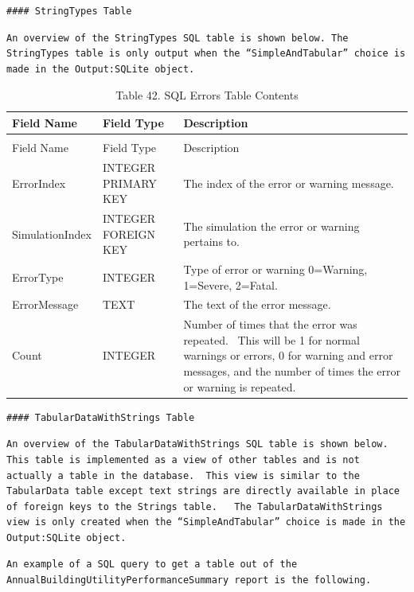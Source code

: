 \begin{lstlisting}
#### StringTypes Table
\end{lstlisting}

\begin{lstlisting}
An overview of the StringTypes SQL table is shown below. The StringTypes table is only output when the “SimpleAndTabular” choice is made in the Output:SQLite object.
\end{lstlisting}

\begin{longtable}[c]{p{1.5in}p{1.5in}p{2.99in}}
\caption{Table 42. SQL Errors Table Contents \label{table:table-42.-sql-errors-table-contents}} \tabularnewline
\toprule 
Field Name & Field Type & Description \tabularnewline
\midrule
\endfirsthead

\caption[]{Table 42. SQL Errors Table Contents} \tabularnewline
\toprule 
Field Name & Field Type & Description \tabularnewline
\midrule
\endhead

ErrorIndex & INTEGER PRIMARY KEY & The index of the error or warning message. \tabularnewline
SimulationIndex & INTEGER FOREIGN KEY & The simulation the error or warning pertains to. \tabularnewline
ErrorType & INTEGER & Type of error or warning 0=Warning, 1=Severe, 2=Fatal. \tabularnewline
ErrorMessage & TEXT & The text of the error message. \tabularnewline
Count & INTEGER & Number of times that the error was repeated.~ This will be 1 for normal warnings or errors, 0 for warning and error messages, and the number of times the error or warning is repeated. \tabularnewline
\bottomrule
\end{longtable}

\begin{lstlisting}
#### TabularDataWithStrings Table
\end{lstlisting}

\begin{lstlisting}
An overview of the TabularDataWithStrings SQL table is shown below.  This table is implemented as a view of other tables and is not actually a table in the database.  This view is similar to the TabularData table except text strings are directly available in place of foreign keys to the Strings table.   The TabularDataWithStrings view is only created when the “SimpleAndTabular” choice is made in the Output:SQLite object.
\end{lstlisting}

\begin{lstlisting}
An example of a SQL query to get a table out of the AnnualBuildingUtilityPerformanceSummary report is the following.
\end{lstlisting}

